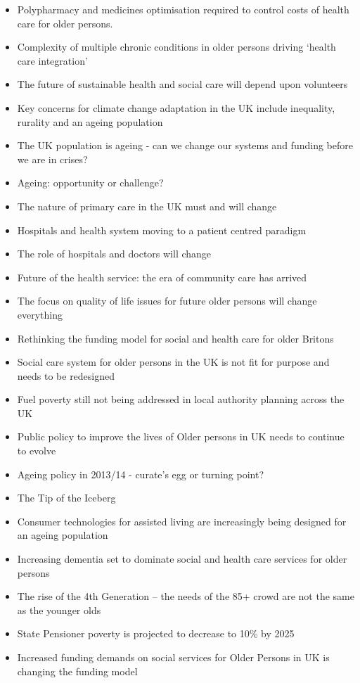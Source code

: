 \begin{itemize}
\item Polypharmacy and medicines optimisation required to control costs of health care for older persons.
\item Complexity of multiple chronic conditions in older persons driving `health care integration'
\item The future of sustainable health and social care will depend upon volunteers	
\item Key concerns for climate change adaptation in the UK include inequality, rurality and an ageing population
\item The UK population is ageing - can we change our systems and funding before we are in crises?
\item Ageing: opportunity or challenge?
\item The nature of primary care in the UK must and will change
\item Hospitals and health system moving to a patient centred paradigm
\item The role of hospitals and doctors will change
\item Future of the health service: the era of community care has arrived
\item The focus on quality of life issues for future older persons will change everything
\item Rethinking the funding model for social and health care for older Britons
\item Social care system for older persons in the UK is not fit for purpose and needs to be redesigned
\item Fuel poverty still not being addressed in local authority planning across the UK
\item Public policy to improve the lives of Older persons in UK needs to continue to evolve
\item Ageing policy in 2013/14 - curate's egg or turning point?
\item The Tip of the Iceberg
\item Consumer technologies for assisted living are increasingly being designed for an ageing population
\item Increasing dementia set to dominate social and health care services for older persons
\item The rise of the 4th Generation -- the needs of the 85+ crowd are not the same as the younger olds
\item State Pensioner poverty is projected to decrease to 10\% by 2025
\item Increased funding demands on social services for Older Persons in UK is changing the funding model

\end{itemize}
